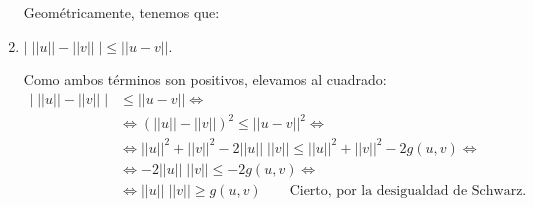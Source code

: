 \begin{ejercicio}
\begin{enumerate}
        Geométricamente, tenemos que:
        \begin{figure}[H]
            \centering
        \end{figure}

        \item $\big| \;||u||-||v|| \;\big| \leq ||u-v||$.

        Como ambos términos son positivos, elevamos al cuadrado:
        \begin{equation*}\begin{split}
            \big| \;||u||-||v|| \;\big| &\leq ||u-v||
            \Longleftrightarrow \\ &\Longleftrightarrow (||u||-||v||)^2 \leq ||u-v||^2 
            \Longleftrightarrow \\ &\Longleftrightarrow
            ||u||^2 + ||v||^2 - 2||u||\;||v|| \leq ||u||^2 +||v||^2 -2g(u,v)
            \Longleftrightarrow \\ &\Longleftrightarrow
            - 2||u||\;||v|| \leq -2g(u,v)
            \Longleftrightarrow \\ &\Longleftrightarrow
             ||u||\;||v|| \geq g(u,v) \qquad \text{Cierto, por la desigualdad de Schwarz.}
        \end{split}\end{equation*}
    \end{enumerate}
\end{ejercicio}



